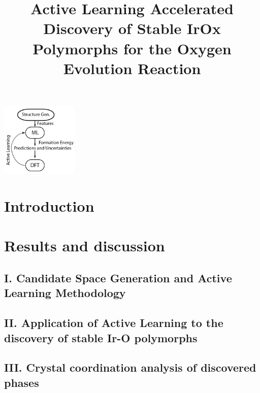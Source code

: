 \documentclass[%
  journal=cmatex,
  manuscript=article,
  ]{achemso}
\title[ML discovered \IrOx phases]{
Active Learning Accelerated Discovery of Stable IrOx Polymorphs for the Oxygen Evolution Reaction
}
\begin{document}
\begin{tocentry}
\begin{center}
\includegraphics[height=3.5cm]{02_figures/al_diagram/Surrogate_model}
\end{center}
\end{tocentry}


\begin{abstract}

\end{abstract}

\section{Introduction}


\section{Results and discussion}

  \subsection{I. Candidate Space Generation and Active Learning Methodology}
  

  \subsection{II. Application of Active Learning to the discovery of stable Ir-O polymorphs}
  

  \subsection{III. Crystal coordination analysis of discovered phases}
  
\end{document}
